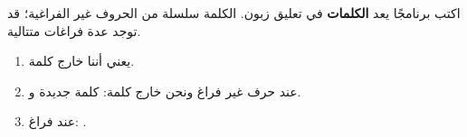 \begin{statement}
اكتب برنامجًا يعد \textbf{الكلمات} في تعليق زبون. الكلمة سلسلة من الحروف غير الفراغية؛ قد توجد عدة فراغات متتالية.
\end{statement}
\begin{stepsbox}\begin{enumerate}
\item {} يعني أننا خارج كلمة.
\item عند حرف غير فراغ ونحن خارج كلمة: كلمة جديدة  و.
\item عند فراغ: .
\end{enumerate}\end{stepsbox}
